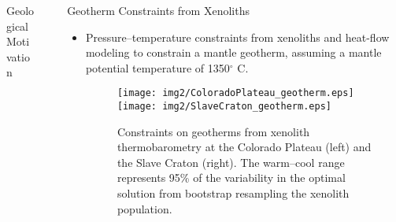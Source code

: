 \documentclass[final]{beamer}
\newlength{\sepwid}
\newlength{\onecolwid}
\newlength{\twocolwid}
\begin{document}
\begin{frame}[t]
\begin{columns}[t]
\begin{column}{\onecolwid}
\begin{block}{Geological Motivation}
\begin{itemize}
\end{itemize}

\end{block}




\end{column} %

\begin{column}{\sepwid}\end{column} %

\begin{column}{\twocolwid} %

\begin{columns}[t,totalwidth=\twocolwid] %

\begin{column}{\onecolwid}\vspace{-.6in} %


\begin{block}{Geotherm Constraints from Xenoliths}

\begin{itemize}

\item Pressure--temperature constraints from xenoliths \cite{Lee2011} and heat-flow modeling \cite{Rudnick1998} to constrain a mantle geotherm, assuming a mantle potential temperature of 1350$^\circ$ C.

\begin{figure}
\texttt{[image: img2/ColoradoPlateau\_geotherm.eps]}
\texttt{[image: img2/SlaveCraton\_geotherm.eps]}
\caption{Constraints on geotherms from xenolith thermobarometry at the Colorado Plateau (left) and the Slave Craton (right).  The warm--cool range represents 95\% of the variability in the optimal solution from bootstrap resampling the xenolith population.}
\end{figure}


\end{itemize}
\end{block}
\end{column}
\end{columns}
\end{column}
\end{columns}
\end{frame}
\end{document}
